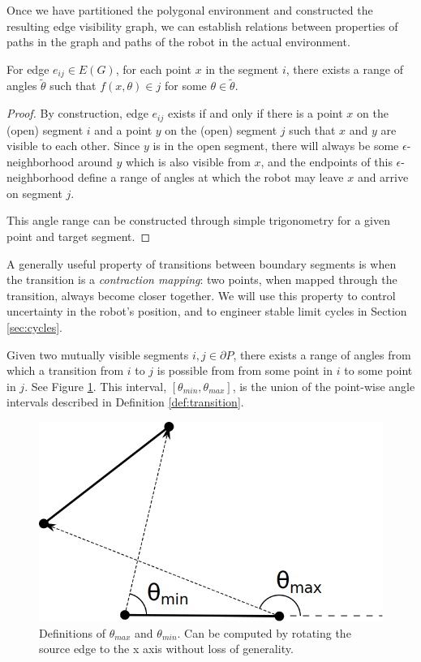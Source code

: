 \documentclass[]{styles/svproc}  %
\begin{document}
Once we have partitioned the polygonal environment and constructed the resulting
edge visibility graph, we can establish relations between properties of
paths in the graph and paths of the robot in the actual environment.

\begin{definition}\label{def:transition}
For edge $e_{ij} \in E(G)$, for each point $x$ in the segment $i$, there 
exists a range of angles $\tilde{\theta}$ such that $f(x,\theta) \in j$ for
some $\theta \in \tilde{\theta}$.
\end{definition}

\begin{proof}
By construction, edge $e_{ij}$ exists if and only if there is a point $x$ on the (open)
segment $i$ and a point $y$ on the (open) segment $j$ such that $x$ and $y$ are
visible to each other. Since $y$ is in the open segment, there will always be some $\epsilon$-neighborhood around
$y$ which is also visible from $x$, and the endpoints of this
$\epsilon$-neighborhood define a range of angles at which the robot may leave
$x$ and arrive on segment $j$.

This angle range can be constructed through simple trigonometry for a
given point and target segment.
\end{proof}

A generally useful property of transitions between boundary segments is when the
transition is a \emph{contraction mapping}: two points, when mapped through the
transition, always become closer together. We will use this property to control
uncertainty in the robot's position, and to engineer stable limit cycles in
Section \ref{sec:cycles}.


\begin{definition} \label{def:angrange}
Given two mutually visible segments $i,j \in \partial P$, there exists a range 
of angles from which a transition from $i$ to $j$ is possible from from some
point in $i$ to some point in $j$.
See Figure \ref{fig:bounce_range}. This interval, $[\theta_{min}, \theta_{max}]$, 
is the union of the point-wise angle intervals described in Definition
\ref{def:transition}.
\end{definition}

\begin{figure}
    \centering
    \includegraphics[width=0.4\linewidth]{figures/bouncerange.png}
    \caption{Definitions of $\theta_{max}$ and $\theta_{min}$. Can be computed
by rotating the source edge to the x axis without loss of generality.}
\label{fig:bounce_range}
\end{figure}
\end{document}
